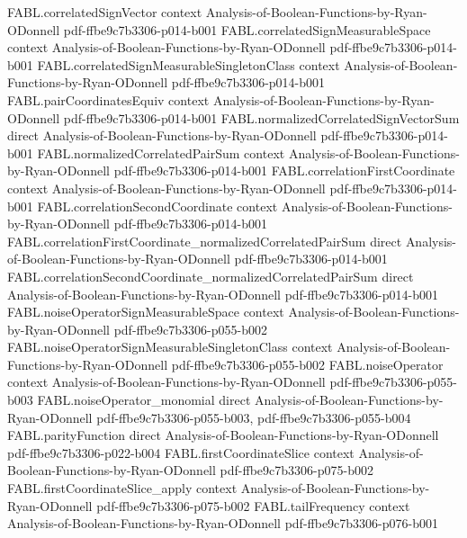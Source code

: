 \begin{theorem}
\proofstep
  {FABL.correlatedSignVector}
  {context}
  {Analysis-of-Boolean-Functions-by-Ryan-ODonnell}
  {pdf-ffbe9c7b3306-p014-b001}
\proofstep
  {FABL.correlatedSignMeasurableSpace}
  {context}
  {Analysis-of-Boolean-Functions-by-Ryan-ODonnell}
  {pdf-ffbe9c7b3306-p014-b001}
\proofstep
  {FABL.correlatedSignMeasurableSingletonClass}
  {context}
  {Analysis-of-Boolean-Functions-by-Ryan-ODonnell}
  {pdf-ffbe9c7b3306-p014-b001}
\proofstep
  {FABL.pairCoordinatesEquiv}
  {context}
  {Analysis-of-Boolean-Functions-by-Ryan-ODonnell}
  {pdf-ffbe9c7b3306-p014-b001}
\proofstep
  {FABL.normalizedCorrelatedSignVectorSum}
  {direct}
  {Analysis-of-Boolean-Functions-by-Ryan-ODonnell}
  {pdf-ffbe9c7b3306-p014-b001}
\proofstep
  {FABL.normalizedCorrelatedPairSum}
  {context}
  {Analysis-of-Boolean-Functions-by-Ryan-ODonnell}
  {pdf-ffbe9c7b3306-p014-b001}
\proofstep
  {FABL.correlationFirstCoordinate}
  {context}
  {Analysis-of-Boolean-Functions-by-Ryan-ODonnell}
  {pdf-ffbe9c7b3306-p014-b001}
\proofstep
  {FABL.correlationSecondCoordinate}
  {context}
  {Analysis-of-Boolean-Functions-by-Ryan-ODonnell}
  {pdf-ffbe9c7b3306-p014-b001}
\proofstep
  {FABL.correlationFirstCoordinate_normalizedCorrelatedPairSum}
  {direct}
  {Analysis-of-Boolean-Functions-by-Ryan-ODonnell}
  {pdf-ffbe9c7b3306-p014-b001}
\proofstep
  {FABL.correlationSecondCoordinate_normalizedCorrelatedPairSum}
  {direct}
  {Analysis-of-Boolean-Functions-by-Ryan-ODonnell}
  {pdf-ffbe9c7b3306-p014-b001}
\proofstep
  {FABL.noiseOperatorSignMeasurableSpace}
  {context}
  {Analysis-of-Boolean-Functions-by-Ryan-ODonnell}
  {pdf-ffbe9c7b3306-p055-b002}
\proofstep
  {FABL.noiseOperatorSignMeasurableSingletonClass}
  {context}
  {Analysis-of-Boolean-Functions-by-Ryan-ODonnell}
  {pdf-ffbe9c7b3306-p055-b002}
\proofstep
  {FABL.noiseOperator}
  {context}
  {Analysis-of-Boolean-Functions-by-Ryan-ODonnell}
  {pdf-ffbe9c7b3306-p055-b003}
\proofstep
  {FABL.noiseOperator_monomial}
  {direct}
  {Analysis-of-Boolean-Functions-by-Ryan-ODonnell}
  {pdf-ffbe9c7b3306-p055-b003,
    pdf-ffbe9c7b3306-p055-b004}
\proofstep
  {FABL.parityFunction}
  {direct}
  {Analysis-of-Boolean-Functions-by-Ryan-ODonnell}
  {pdf-ffbe9c7b3306-p022-b004}
\proofstep
  {FABL.firstCoordinateSlice}
  {context}
  {Analysis-of-Boolean-Functions-by-Ryan-ODonnell}
  {pdf-ffbe9c7b3306-p075-b002}
\proofstep
  {FABL.firstCoordinateSlice_apply}
  {context}
  {Analysis-of-Boolean-Functions-by-Ryan-ODonnell}
  {pdf-ffbe9c7b3306-p075-b002}
\proofstep
  {FABL.tailFrequency}
  {context}
  {Analysis-of-Boolean-Functions-by-Ryan-ODonnell}
  {pdf-ffbe9c7b3306-p076-b001}

\end{theorem}
